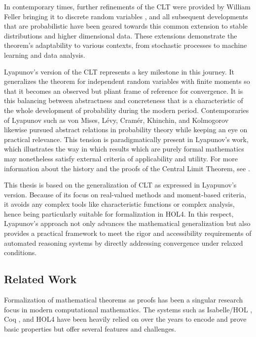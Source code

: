 In contemporary times, further refinements of the CLT were provided by William Feller bringing it to discrete random variables \cite{feller1945}, and all subsequent developments that are probabilistic have been geared towards this common extension to stable distributions and higher dimensional data. These extensions demonstrate the theorem’s adaptability to various contexts, from stochastic processes to machine learning and data analysis.

Lyapunov’s version of the CLT represents a key milestone in this journey. It generalizes the theorem for independent random variables with finite moments so that it becomes an observed but pliant frame of reference for convergence. It is this balancing between abstractness and concreteness that is a characteristic of the whole development of probability during the modern period. Contemporaries of Lyapunov such as von Mises, Lévy, Cramér, Khinchin, and Kolmogorov likewise pursued abstract relations in probability theory while keeping an eye on practical relevance. This tension is paradigmatically present in Lyapunov's work, which illustrates the way in which results which are purely formal mathematics may nonetheless satisfy external criteria of applicability and utility. For more information about the history and the proofs of the Central Limit Theorem, see \cite{fischer2011history, adams2009life}.

This thesis is based on the generalization of CLT as expressed in Lyapunov's version. Because of its focus on real-valued methods and moment-based criteria, it avoids any complex tools like characteristic functions or complex analysis, hence being particularly suitable for formalization in HOL4. In this respect, Lyapunov's approach not only advances the mathematical generalization but also provides a practical framework to meet the rigor and accessibility requirements of automated reasoning systems by directly addressing convergence under relaxed conditions.

\subsection{Related Work}

Formalization of mathematical theorems as proofs has been a singular research focus in modern computational mathematics. The systems such as Isabelle/HOL \cite{isabelle}, Coq \cite{bertot2013interactive}, and HOL4 \cite{slind2008brief} have been heavily relied on over the years to encode and prove basic properties but offer several features and challenges. 

